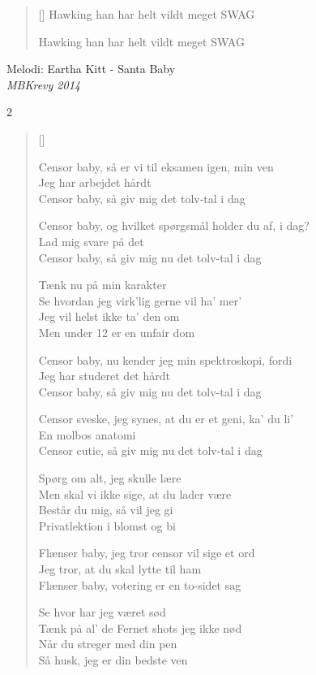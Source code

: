 {\begin{multicols}
\begin{verse}[\versewidth]
Hawking han har helt vildt meget SWAG

Hawking han har helt vildt meget SWAG
\end{verse}
\end{multicols}


\newpage



{Melodi: Eartha Kitt - Santa Baby}\\[.2em]
{\small\itshape MBKrevy 2014}
\begin{multicols}2
\settowidth{\versewidth}{Censor baby, jeg mangler kun at nævne en ting, Latex-s}
\begin{verse}[\versewidth]

Censor baby, så er vi til eksamen igen, min ven\\
Jeg har arbejdet hårdt\\
Censor baby, så giv mig det tolv-tal i dag

Censor baby, og hvilket spørgsmål holder du af, i dag?\\
Lad mig svare på det\\
Censor baby, så giv mig nu det tolv-tal i dag

Tænk nu på min karakter\\
Se hvordan jeg virk'lig gerne vil ha' mer'\\
Jeg vil helst ikke ta' den om\\
Men under 12 er en unfair dom

Censor baby, nu kender jeg min spektroskopi, fordi\\
Jeg har studeret det hårdt\\
Censor baby, så giv mig nu det tolv-tal i dag

Censor sveske, jeg synes, at du er et geni, ka' du li'\\
En molbos anatomi\\
Censor cutie, så giv mig nu det tolv-tal i dag

Spørg om alt, jeg skulle lære\\
Men skal vi ikke sige, at du lader være\\
Består du mig, så vil jeg gi\\
Privatlektion i blomst og bi

Flænser baby, jeg tror censor vil sige et ord\\
Jeg tror, at du skal lytte til ham\\
Flænser baby, votering er en to-sidet sag

Se hvor har jeg været sød\\
Tænk på al' de Fernet shots jeg ikke nød\\
Når du streger med din pen\\
Så husk, jeg er din bedste ven


\end{verse}
\end{multicols}}
